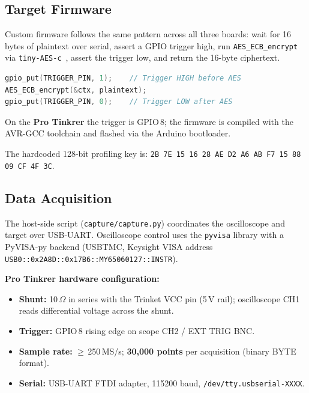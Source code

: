 \subsection{Target Firmware}
\label{sec:method:fw}

Custom firmware follows the same pattern across all three boards: wait for
16 bytes of plaintext over serial, assert a GPIO trigger high, run
\texttt{AES\_ECB\_encrypt} via \texttt{tiny-AES-c}~\cite{tinyaes},
assert the trigger low, and return the 16-byte ciphertext.

\begin{lstlisting}[language=C, caption={Trigger and encryption loop (all targets)}]
gpio_put(TRIGGER_PIN, 1);    // Trigger HIGH before AES
AES_ECB_encrypt(&ctx, plaintext);
gpio_put(TRIGGER_PIN, 0);    // Trigger LOW after AES
\end{lstlisting}

On the \textbf{Pro Tinkrer } the trigger is GPIO\,8; the firmware is
compiled with the AVR-GCC toolchain and flashed via the Arduino bootloader.

The hardcoded 128-bit profiling key is:
\texttt{2B 7E 15 16 28 AE D2 A6 AB F7 15 88 09 CF 4F 3C}.

\subsection{Data Acquisition}
\label{sec:method:acq}

The host-side script (\texttt{capture/capture.py}) coordinates the
oscilloscope and target over USB-UART.
Oscilloscope control uses the \texttt{pyvisa} library with a PyVISA-py
backend (USBTMC, Keysight VISA address
\texttt{USB0::0x2A8D::0x17B6::MY65060127::INSTR}).

\textbf{Pro Tinkrer hardware configuration:}
\begin{itemize}
  \item \textbf{Shunt:} 10\,$\Omega$ in series with the Trinket VCC pin
        (5\,V rail); oscilloscope CH1 reads differential voltage across
        the shunt.
  \item \textbf{Trigger:} GPIO\,8 rising edge on scope CH2 / EXT TRIG BNC.
  \item \textbf{Sample rate:} $\geq$\,250\,MS/s; \textbf{30{,}000 points}
        per acquisition (binary BYTE format).
  \item \textbf{Serial:} USB-UART FTDI adapter, 115200 baud,
        \texttt{/dev/tty.usbserial-XXXX}.
\end{itemize}

